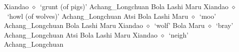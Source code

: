 \hspace{1ex}
         Xiandao 
\hspace{1ex}
         $\diamond$~`grunt (of pigs)'
         Achang\_Longchuan 
\hspace{1ex}
         Bola 
\hspace{1ex}
         Lashi 
\hspace{1ex}
         Maru 
\hspace{1ex}
         Xiandao 
\hspace{1ex}
         $\diamond$~`howl (of wolves)'
         Achang\_Longchuan 
\hspace{1ex}
         Atsi 
\hspace{1ex}
         Bola 
\hspace{1ex}
         Lashi 
\hspace{1ex}
         Maru 
\hspace{1ex}
         $\diamond$~`moo'
         Achang\_Longchuan 
\hspace{1ex}
         Bola 
\hspace{1ex}
         Lashi 
\hspace{1ex}
         Maru 
\hspace{1ex}
         Xiandao 
\hspace{1ex}
         $\diamond$~`wolf'
         Bola 
\hspace{1ex}
         Maru 
\hspace{1ex}
         $\diamond$~`bray'
         Achang\_Longchuan 
\hspace{1ex}
         Atsi 
\hspace{1ex}
         Bola 
\hspace{1ex}
         Lashi 
\hspace{1ex}
         Maru 
\hspace{1ex}
         Xiandao 
\hspace{1ex}
         $\diamond$~`neigh'
         Achang\_Longchuan 
